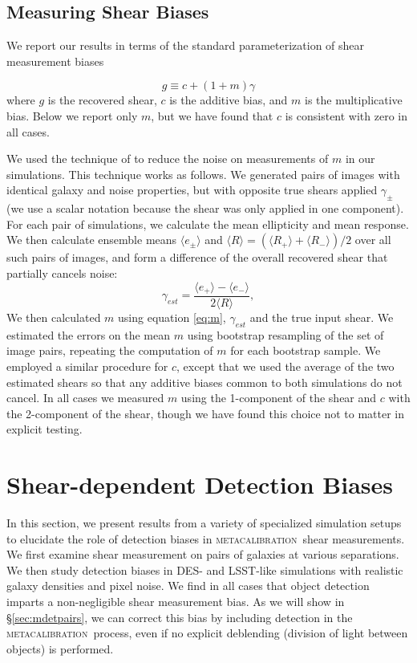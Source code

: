 \documentclass[iop, twocolappendix, appendixfloats, numberedappendix, apj]{hackemulateapj}
\newcommand{\mcal}{\textsc{metacalibration}}
\begin{document}
\subsection{Measuring Shear Biases}

We report our results in terms of the standard parameterization of shear
measurement biases \citep[see, e.g.,][]{heymans2006}

\begin{equation} \label{eq:m}
g \equiv c + (1 + m)\gamma
\end{equation}
where $g$ is the recovered shear, $c$ is the additive bias, and $m$ is the
multiplicative bias. Below we report only $m$, but we have found that $c$ is
consistent with zero in all cases.

We used the technique of \citet{pujol2019} to reduce the noise on measurements
of $m$ in our simulations.  This technique works as follows. We generated pairs
of images with identical galaxy and noise properties, but with opposite true
shears applied $\gamma_{\pm}$ (we use a scalar notation because the shear
was only applied in one component).  For each pair of simulations, we calculate the mean
ellipticity and mean response.  We then calculate ensemble means $\langle e_\pm \rangle$
and $\langle R \rangle = ( \langle R_+ \rangle + \langle R_- \rangle)/2$ over all such
pairs of images, and form a difference of the overall recovered shear that
partially cancels noise:
\begin{equation}
    \gamma_{est} = \frac{ \langle e_+ \rangle - \langle e_- \rangle}{2 \langle R \rangle},
\end{equation}
We then calculated $m$ using equation \ref{eq:m}, $\gamma_{est}$ and the true
input shear.  We estimated the errors on the mean $m$ using bootstrap
resampling of the set of image pairs, repeating the computation of $m$ for each
bootstrap sample. We employed a similar procedure for $c$, except that we used
the average of the two estimated shears so that any additive biases common to
both simulations do not cancel. In all  cases we measured $m$ using the
1-component of the shear and $c$ with the 2-component of the shear, though we
have found this choice not to matter in explicit testing.

\section{Shear-dependent Detection Biases}\label{sec:detbiases}

In this section, we present results from a variety of specialized simulation
setups to elucidate the role of detection biases in \mcal\ shear measurements.
We first examine shear measurement on pairs of galaxies at various separations.
We then study detection biases in DES- and LSST-like simulations with
realistic galaxy densities and pixel noise. We find in all cases that object
detection imparts a non-negligible shear measurement bias. As we will show in
\S \ref{sec:mdetpairs}, we can correct this bias by including detection in the
\mcal\ process, even if no explicit deblending (division of light between
objects) is performed.
\end{document}
